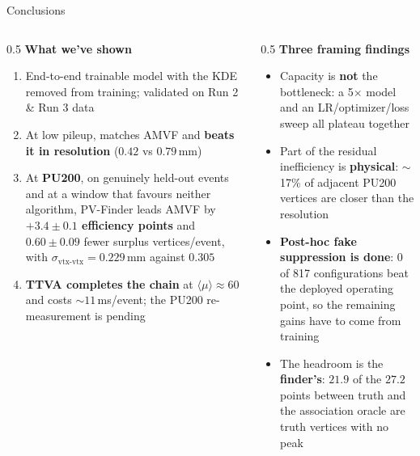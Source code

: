\documentclass[xcolor=table,aspectratio=169]{beamer}
\begin{document}
\begin{frame}{Conclusions}
    \begin{columns}[t]
        \begin{column}{0.5\linewidth}
            \textbf{What we've shown}
            \begin{enumerate}
                \setlength\itemsep{0.4em}
                \item End-to-end trainable model with the KDE removed from training; validated on Run 2 \& Run 3 data
                \item At low pileup, matches AMVF and \textbf{beats it in resolution} ($0.42$ vs $0.79$\,mm)
                \item At \textbf{PU200}, on genuinely held-out events and at a window
                    that favours neither algorithm, PV-Finder leads AMVF by
                    \textbf{$+3.4 \pm 0.1$ efficiency points} and
                    $0.60 \pm 0.09$ fewer surplus vertices/event,
                    with $\sigma_{\text{vtx-vtx}} = 0.229$\,mm against $0.305$
                \item \textbf{TTVA completes the chain} at $\langle\mu\rangle\!\approx\!60$
                    and costs \(\sim\)$11$\,ms/event; the PU200 re-measurement is pending
            \end{enumerate}
        \end{column}
        \begin{column}{0.5\linewidth}
            \textbf{Three framing findings}
            \begin{itemize}
                \setlength\itemsep{0.35em}
                \item Capacity is \textbf{not} the bottleneck: a 5$\times$ model and an LR/optimizer/loss sweep all plateau together
                \item Part of the residual inefficiency is \textbf{physical}: $\sim$17\% of adjacent PU200 vertices are closer than the resolution
                \item \textbf{Post-hoc fake suppression is done}: 0 of 817 configurations beat the deployed operating point, so the remaining gains have to come from training
                \item The headroom is the \textbf{finder's}: $21.9$ of the $27.2$ points between truth and the association oracle are truth vertices with no peak
            \end{itemize}
        \end{column}
    \end{columns}
\end{frame}
\end{document}
